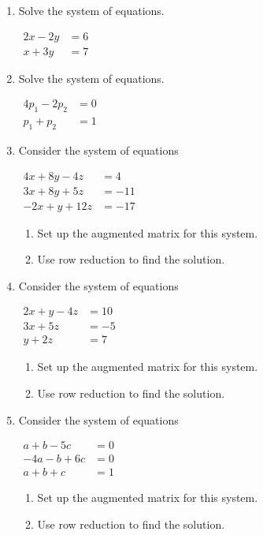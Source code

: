 \begin{enumerate}
\item  Solve the system of equations.

$\begin{matrix}
2x-2y&=6\\x+3y&=7
\end{matrix}$

\vspace{.1in}


\item  Solve the system of equations.

$\begin{matrix}
4p_1-2p_2&=0\\p_1+p_2&=1
\end{matrix}$
\vspace{.1in}

\item Consider the system of equations 

$\begin{matrix}
4x+8y-4z&=4\\3x+8y+5z&=-11\\-2x+y+12z&=-17
\end{matrix}$
\begin{enumerate}
\item Set up the augmented matrix for this system.
\item Use row reduction to find the solution.
\vspace{.1in}
\end{enumerate}

\item Consider the system of equations 

$\begin{matrix}
2x+y-4z&=10\\3x+5z&=-5\\y+2z&=7
\end{matrix}$
\begin{enumerate}
\item Set up the augmented matrix for this system.
\item Use row reduction to find the solution.
\vspace{.1in}
\end{enumerate}


\item Consider the system of equations 

$\begin{matrix}
a+b-5c&=0\\-4a-b+6c&=0\\a+b+c&=1
\end{matrix}$
\begin{enumerate}
\item Set up the augmented matrix for this system.
\item Use row reduction to find the solution.
\vspace{.1in}
\end{enumerate}


\end{enumerate}
